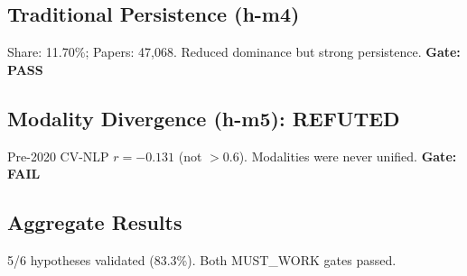 \subsection{Traditional Persistence (h-m4)}

Share: 11.70\%; Papers: 47,068. Reduced dominance but strong persistence. \textbf{Gate: PASS}

\subsection{Modality Divergence (h-m5): REFUTED}

Pre-2020 CV-NLP $r = -0.131$ (not $>0.6$). Modalities were never unified. \textbf{Gate: FAIL}

\subsection{Aggregate Results}

5/6 hypotheses validated (83.3\%). Both MUST\_WORK gates passed.
